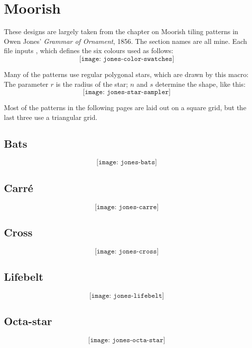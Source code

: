 \documentclass[a4paper]{scrartcl}
\begin{document}
\section{Moorish}

These designs are largely taken from the chapter on Moorish tiling patterns in Owen
Jones' \textit{Grammar of Ornament}, 1856. The section names are all mine.  Each file inputs
, which defines the six colours used as follows:
$$\texttt{[image: jones-color-swatches]}$$

\bigskip\noindent
Many of the patterns use regular polygonal stars, which are drawn by this macro:
\noindent
The parameter $r$ is the radius of the star; $n$ and $s$ determine the shape, like
this:
$$\texttt{[image: jones-star-sampler]}$$

\bigskip\noindent
Most of the patterns in the following pages are laid out on a square grid, 
but the last three use a triangular grid.

\subsection{Bats}
$$\texttt{[image: jones-bats]}$$

\subsection{Carré}
$$\texttt{[image: jones-carre]}$$

\subsection{Cross}
$$\texttt{[image: jones-cross]}$$

\subsection{Lifebelt}
$$\texttt{[image: jones-lifebelt]}$$

\subsection{Octa-star}
$$\texttt{[image: jones-octa-star]}$$
\end{document}
